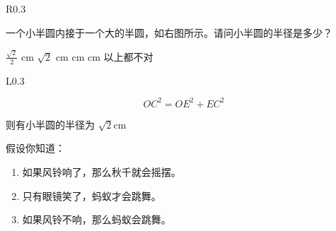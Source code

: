 \documentclass[answers]{exam}
\begin{document}
\begin{questions}
\begin{minipage}[t]{0.95\textwidth}
\begin{wrapfigure}{R}{0.3\textwidth}
		\end{wrapfigure}

		一个小半圆内接于一个大的半圆，如右图所示。请问小半圆的半径是多少？

		\begin{oneparchoices}
			\choice \( \frac{\sqrt{2}}{2} \) cm
			\CorrectChoice \( \sqrt{2} \) cm
			 cm
			 cm
			\choice 以上都不对
		\end{oneparchoices}
	\end{minipage}

	\begin{solution}
		\begin{minipage}[t]{0.95\textwidth}
			\begin{wrapfigure}{L}{0.3\textwidth}
			\end{wrapfigure}

			\begin{equation*}
				OC^2 = OE^2 + EC^2
			\end{equation*}

			则有小半圆的半径为 \( \sqrt{2} \)cm
		\end{minipage}
		\vspace{2cm}

	\end{solution}

	\question 假设你知道：
	\begin{enumerate}[label=\roman*] 
		\item 如果风铃响了，那么秋千就会摇摆。
		\item 只有眼镜笑了，蚂蚁才会跳舞。
		\item 如果风铃不响，那么蚂蚁会跳舞。
	\end{enumerate}


\end{questions}
\end{document}
